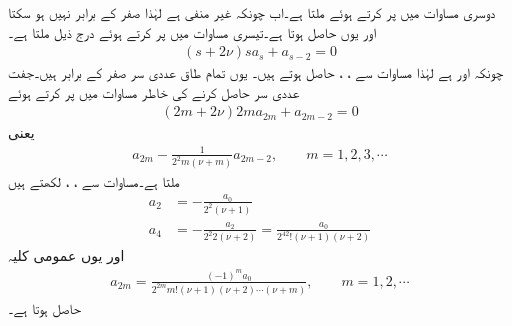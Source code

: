 دوسری مساوات   میں  پر کرتے ہوئے  ملتا ہے۔اب چونکہ  غیر منفی ہے لہٰذا  صفر کے برابر نہیں ہو سکتا اور یوں  حاصل ہوتا ہے۔تیسری مساوات   میں  پر کرتے ہوئے درج ذیل ملتا ہے۔
\begin{align}\label{مساوات_بیسل_ٹ}
(s+2\nu)sa_s+a_{s-2}=0
\end{align}
چونکہ  اور  ہے  لہٰذا مساوات  سے ، ،  حاصل ہوتے ہیں۔ یوں تمام طاق عددی سر صفر کے برابر ہیں۔جفت عددی سر حاصل کرنے کی خاطر مساوات  میں  پر کرتے ہوئے
\begin{align*}
(2m+2\nu)2ma_{2m}+a_{2m-2}=0
\end{align*}
یعنی
\begin{align}\label{مساوات_بیسل_ث}
a_{2m}-\frac{1}{2^2m(\nu+m)}a_{2m-2},\quad \quad m=1,2,3,\cdots
\end{align}
ملتا ہے۔مساوات  سے ، ،  لکھتے ہیں
\begin{align*}
a_2&=-\frac{a_0}{2^2(\nu+1)}\\
a_4&=-\frac{a_2}{2^2 2(\nu+2)}=\frac{a_0}{2^42!(\nu+1)(\nu+2)}
\end{align*}
اور یوں عمومی کلیہ 
\begin{align}\label{مساوات_بیسل_ج}
a_{2m}=\frac{(-1)^m a_0}{2^{2m}m!(\nu+1)(\nu+2)\cdots (\nu+m)},\quad \quad m=1,2,\cdots
\end{align}
حاصل ہوتا ہے۔

